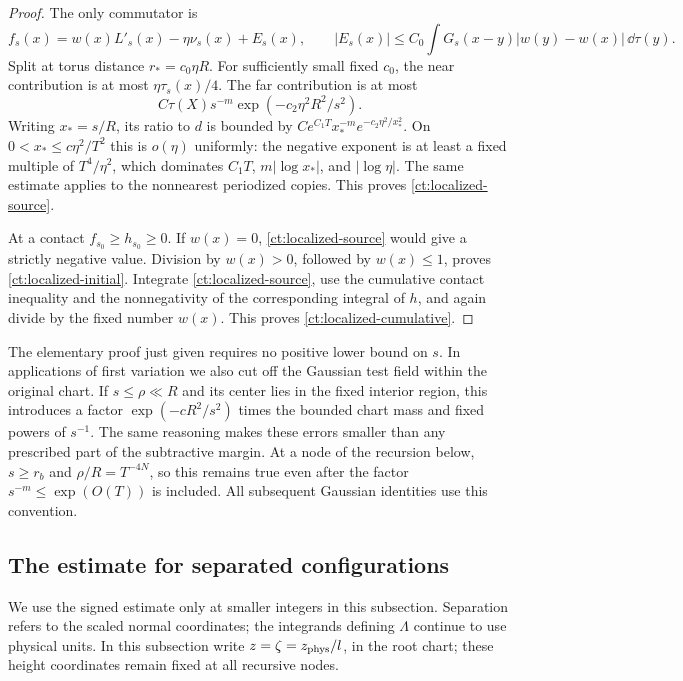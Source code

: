 \begin{proof}
The only commutator is
\[
 f_s(x)=w(x)L'_s(x)-\eta\nu_s(x)+E_s(x),\qquad
 |E_s(x)|\le C_0\int G_s(x-y)|w(y)-w(x)|\,\dd\tau(y).
\]
Split at torus distance $r_*=c_0\eta R$.  For sufficiently small fixed
$c_0$, the near contribution is at most $\eta\tau_s(x)/4$.
The far contribution is at most
\[
 C\tau(X)s^{-m}\exp(-c_2\eta^2R^2/s^2).
\]
Writing $x_*=s/R$, its ratio to $d$ is bounded by
$Ce^{C_1T}x_*^{-m}e^{-c_2\eta^2/x_*^2}$.
On $0<x_*\le c\eta^2/T^2$ this is $o(\eta)$ uniformly:
the negative exponent is at least a fixed multiple of $T^4/\eta^2$,
which dominates $C_1T$, $m|\log x_*|$, and $|\log\eta|$.
The same estimate applies to the nonnearest periodized copies.
This proves \eqref{ct:localized-source}.

At a contact $f_{s_0}\ge h_{s_0}\ge0$.  If $w(x)=0$,
\eqref{ct:localized-source} would give a strictly negative value.
Division by $w(x)>0$, followed by $w(x)\le1$, proves
\eqref{ct:localized-initial}.  Integrate
\eqref{ct:localized-source}, use the cumulative contact inequality and
the nonnegativity of the corresponding integral of $h$, and again
divide by the fixed number $w(x)$.  This proves
\eqref{ct:localized-cumulative}.
\end{proof}

The elementary proof just given requires no positive lower bound on
$s$.  In applications of first variation we also cut off the Gaussian
test field within the original chart.  If $s\le\rho\ll R$ and its
center lies in the fixed interior region, this introduces a factor
$\exp(-cR^2/s^2)$ times the bounded chart mass and fixed powers of
$s^{-1}$.  The same reasoning makes these errors smaller than any
prescribed part of the subtractive margin.  At a node of the recursion
below, $s\ge r_b$ and $\rho/R=T^{-4N}$, so this remains true even after
the factor $s^{-m}\le\exp(O(T))$ is included.  All subsequent Gaussian
identities use this convention.

\subsection{The estimate for separated configurations}

We use the signed estimate  only at smaller integers in
this subsection.  Separation refers to the scaled normal coordinates;
the integrands defining $\Lambda$ continue to use physical units.
In this subsection write $z=\zeta=z_{\rm phys}/l$, in the root chart;
these height coordinates remain fixed at all recursive nodes.

